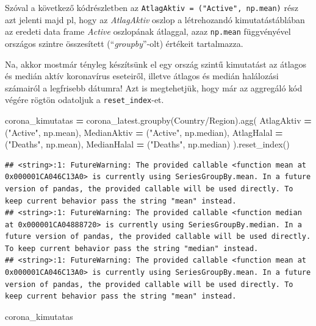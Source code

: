 \documentclass[
]{book}
\newenvironment{Shaded}{\begin{snugshade}}{\end{snugshade}}
\newcommand{\NormalTok}[1]{#1}
\newcommand{\OperatorTok}[1]{\textcolor[rgb]{0.81,0.36,0.00}{\textbf{#1}}}
\newcommand{\StringTok}[1]{\textcolor[rgb]{0.31,0.60,0.02}{#1}}
\begin{document}
Szóval a következő kódrészletben az \texttt{AtlagAktiv\ =\ ("Active",\ np.mean)} rész azt jelenti majd pl, hogy az \emph{AtlagAktiv} oszlop a létrehozandó kimutatástáblában az eredeti data frame \emph{Active} oszlopának átlaggal, azaz \texttt{np.mean} függvényével országos szintre összesített (``\emph{groupby}''-olt) értékeit tartalmazza.

Na, akkor mostmár tényleg készítsünk el egy ország szintű kimutatást az átlagos és medián aktív koronavírus eseteiről, illetve átlagos és medián halálozási számairól a legfrisebb dátumra! Azt is megtehetjük, hogy már az aggregáló kód végére rögtön odatoljuk a \texttt{reset\_index}-et.

\begin{Shaded}
\begin{Highlighting}[]
\NormalTok{corona\_kimutatas }\OperatorTok{=}\NormalTok{ corona\_latest.groupby(}\StringTok{\textquotesingle{}Country/Region\textquotesingle{}}\NormalTok{).agg(}
\NormalTok{  AtlagAktiv }\OperatorTok{=}\NormalTok{ (}\StringTok{"Active"}\NormalTok{, np.mean),}
\NormalTok{  MedianAktiv }\OperatorTok{=}\NormalTok{ (}\StringTok{"Active"}\NormalTok{, np.median),}
\NormalTok{  AtlagHalal }\OperatorTok{=}\NormalTok{ (}\StringTok{"Deaths"}\NormalTok{, np.mean),}
\NormalTok{  MedianHalal }\OperatorTok{=}\NormalTok{ (}\StringTok{"Deaths"}\NormalTok{, np.median)}
\NormalTok{).reset\_index()}
\end{Highlighting}
\end{Shaded}

\begin{verbatim}
## <string>:1: FutureWarning: The provided callable <function mean at 0x000001CA046C13A0> is currently using SeriesGroupBy.mean. In a future version of pandas, the provided callable will be used directly. To keep current behavior pass the string "mean" instead.
## <string>:1: FutureWarning: The provided callable <function median at 0x000001CA04888720> is currently using SeriesGroupBy.median. In a future version of pandas, the provided callable will be used directly. To keep current behavior pass the string "median" instead.
## <string>:1: FutureWarning: The provided callable <function mean at 0x000001CA046C13A0> is currently using SeriesGroupBy.mean. In a future version of pandas, the provided callable will be used directly. To keep current behavior pass the string "mean" instead.
\end{verbatim}

\begin{Shaded}
\begin{Highlighting}[]
\NormalTok{corona\_kimutatas}
\end{Highlighting}
\end{Shaded}
\end{document}
